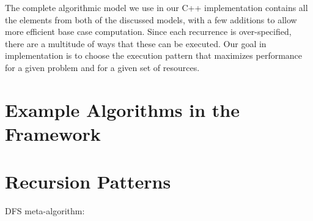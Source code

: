 \documentclass[times, 10pt,twocolumn]{article}
\begin{document}
The complete algorithmic model we use in our C++ implementation contains all the elements from both of the discussed models, with a few additions to allow more efficient base case computation.
Since each recurrence is over-specified, there are a multitude of ways that these can be executed.
Our goal in implementation is to choose the execution pattern that maximizes performance for a given problem and for a given set of resources.

\section{Example Algorithms in the Framework}

\section{Recursion Patterns}

DFS meta-algorithm:
\end{document}
